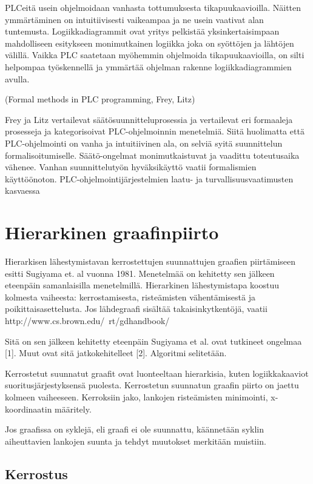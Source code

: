 \documentclass[finnish,12pt]{article}
\begin{document}
PLCeitä usein ohjelmoidaan vanhasta tottumuksesta tikapuukaavioilla.
Näitten ymmärtäminen on intuitiivisesti vaikeampaa ja ne usein vaativat alan tuntemusta.
Logiikkadiagrammit ovat yritys pelkistää yksinkertaisimpaan mahdolliseen esitykseen monimutkainen logiikka joka on syöttöjen ja lähtöjen välillä.
Vaikka PLC saatetaan myöhemmin ohjelmoida tikapuukaavioilla, on silti helpompaa työskennellä ja ymmärtää ohjelman rakenne logiikkadiagrammien avulla.

(Formal methods in PLC programming, Frey, Litz)

Frey ja Litz vertailevat säätösuunnitteluprosessia ja vertailevat eri formaaleja prosesseja ja kategorisoivat PLC-ohjelmoinnin menetelmiä. 
Siitä huolimatta että PLC-ohjelmointi on vanha ja intuitiivinen ala, on selviä syitä suunnittelun formalisoitumiselle.
Säätö-ongelmat monimutkaistuvat ja vaadittu toteutusaika vähenee.
Vanhan suunnittelutyön hyväksikäyttö vaatii formalismien käyttöönoton.
PLC-ohjelmointijärjestelmien laatu- ja turvallisuusvaatimusten kasvaessa 

	\clearpage
	\section{Hierarkinen graafinpiirto}

Hierarkisen lähestymistavan kerrostettujen suunnattujen graafien piirtämiseen esitti Sugiyama et. al vuonna 1981. Menetelmää on kehitetty sen jälkeen eteenpäin samanlaisilla menetelmillä. Hierarkinen lähestymistapa koostuu
kolmesta vaiheesta: kerrostamisesta, risteämisten vähentämisestä ja poikittaisasettelusta. Jos lähdegraafi sisältää takaisinkytkentöjä, vaatii
http://www.cs.brown.edu/~rt/gdhandbook/

Sitä on sen jälkeen kehitetty eteenpäin 
Sugiyama et al. ovat tutkineet ongelmaa [1]. Muut ovat sitä jatkokehitelleet [2]. Algoritmi selitetään.

Kerrostetut suunnatut graafit ovat luonteeltaan hierarkisia, kuten logiikkakaaviot suoritusjärjestyksensä puolesta.
Kerrostetun suunnatun graafin piirto on jaettu kolmeen vaiheeseen. Kerroksiin jako, lankojen risteämisten minimointi, x-koordinaatin määritely.

Jos graafissa on syklejä, eli graafi ei ole suunnattu, käännetään syklin aiheuttavien lankojen suunta ja tehdyt muutokset merkitään muistiin.

	\subsection{Kerrostus}
\end{document}
